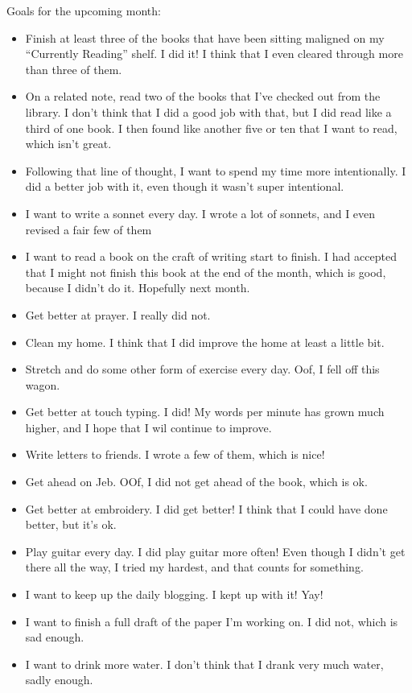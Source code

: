\documentclass[12pt]{article}[titlepage]
\newcommand{\say}[1]{``#1''}
\renewcommand{\,}{\textsuperscript{,}}
\begin{document}
Goals for the upcoming month:
\begin{itemize}
\item Finish at least three of the books that have been sitting maligned on my \say{Currently Reading} shelf. I did it! I think that I even cleared through more than three of them.
\item On a related note, read two of the books that I've checked out from the library. I don't think that I did a good job with that, but I did read like a third of one book. I then found like another five or ten that I want to read, which isn't great.
\item Following that line of thought, I want to spend my time more intentionally. I did a better job with it, even though it wasn't super intentional.
\item I want to write a sonnet every day. I wrote a lot of sonnets, and I even revised a fair few of them
\item I want to read a book on the craft of writing start to finish. I had accepted that I might not finish this book at the end of the month, which is good, because I didn't do it. Hopefully next month.
\item Get better at prayer. I really did not.
\item Clean my home. I think that I did improve the home at least a little bit.
\item Stretch and do some other form of exercise every day. Oof, I fell off this wagon.
\item Get better at touch typing. I did! My words per minute has grown much higher, and I hope that I wil continue to improve.
\item Write letters to friends. I wrote a few of them, which is nice!
\item Get ahead on Jeb. OOf, I did not get ahead of the book, which is ok.
\item Get better at embroidery. I did get better! I think that I could have done better, but it's ok.
\item Play guitar every day. I did play guitar more often! Even though I didn't get there all the way, I tried my hardest, and that counts for something.
\item I want to keep up the daily blogging. I kept up with it! Yay!
\item I want to finish a full draft of the paper I'm working on. I did not, which is sad enough.
\item I want to drink more water. I don't think that I drank very much water, sadly enough.
\end{itemize}
\end{document}
